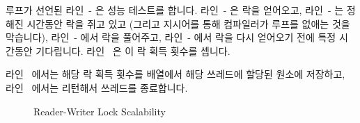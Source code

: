 \begin{lineref}
루프가 선언된 라인~- 은 성능 테스트를 합니다.
라인~- 은 락을 얻어오고,
라인~- 는 정해진 시간동안 락을 쥐고 있고 (그리고
 지시어를 통해 컴파일러가 루프를 없애는 것을 막습니다),
라인~- 에서 락을 풀어주고,
라인~- 에서 락을 다시 얻어오기 전에 특정 시간동안
기다립니다.
라인~ 은 이 락 획득 횟수를 셉니다.

라인~ 에서는 해당 락 획득 횟수를  배열에서 해당
쓰레드에 할당된 원소에 저장하고, 라인~ 에서는 리턴해서 쓰레드를
종료합니다.

\end{lineref}

\begin{figure}[tb]
\centering
{}
\caption{Reader-Writer Lock Scalability}
\label{fig:toolsoftrade:Reader-Writer Lock Scalability}
\end{figure}

